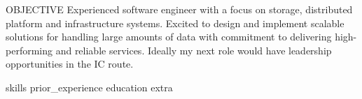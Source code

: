 \documentclass{resume}
\begin{document}

\begin{rSection}{OBJECTIVE}
{Experienced software engineer with a focus on storage, distributed platform and infrastructure systems. Excited to design and implement scalable solutions for handling large amounts of data with commitment to delivering high-performing and reliable services. Ideally my next role would have leadership opportunities in the IC route.}
\end{rSection}


{skills}
{prior_experience}
\newpage
{education}
{extra}
\end{document}
